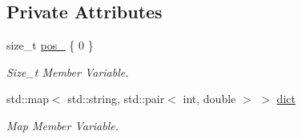 \subsection*{Private Attributes}
\begin{DoxyCompactItemize}
\item 
size\+\_\+t \hyperlink{class_sentence_a9db609523d44fb91ff549e0e232d6c8e}{pos\+\_\+} \{ 0 \}
\begin{DoxyCompactList}\small\item\em Size\+\_\+t Member Variable. \end{DoxyCompactList}\item 
std\+::map$<$ std\+::string, std\+::pair$<$ int, double $>$ $>$ \hyperlink{class_sentence_a7ea4d420881ba68fcdcc90c296884f42}{dict}
\begin{DoxyCompactList}\small\item\em Map Member Variable. \end{DoxyCompactList}\end{DoxyCompactItemize}
